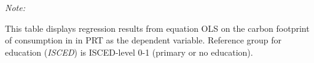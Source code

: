 \begin{table}[htbp!]
\begin{adjustbox}{width = 1\textwidth, max height = 0.95\textheight, center}
\begin{threeparttable}[b]
         \begin{tablenotes}\item \medskip \textit{Note:}
            \item This table displays regression results from equation OLS on the carbon footprint of consumption in  in PRT as the dependent variable.  Reference group for education (\textit{ISCED}) is ISCED-level 0-1 (primary or no education).
         \end{tablenotes}
      \end{threeparttable}
   \end{adjustbox}
\end{table}


